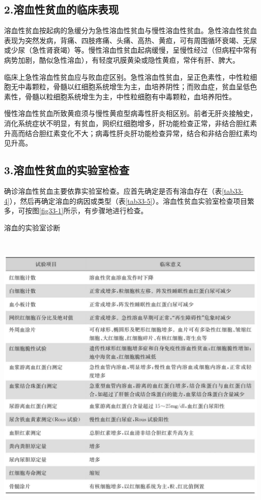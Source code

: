 \subsection{2.溶血性贫血的临床表现}

溶血性贫血按起病的急缓分为急性溶血性贫血与慢性溶血性贫血。急性溶血性贫血表现为突然发病，背痛、四肢疼痛、头痛、高热、黄疸，可有周围循环衰竭、无尿或少尿（急性肾衰竭）等。慢性溶血性贫血起病缓慢，呈慢性经过（但病程中常有病势加剧，酷似急性溶血），有轻度巩膜黄染或隐性黄疸，常伴有肝、脾大。

临床上急性溶血性贫血应与败血症区别。急性溶血性贫血，呈正色素性，中性粒细胞无中毒颗粒，骨髓以红细胞系统增生为主，血培养阴性；而败血症，贫血呈低色素性，骨髓以粒细胞系统增生为主，中性粒细胞有中毒颗粒，血培养阳性。

慢性溶血性贫血所致黄疸须与慢性黄疸型病毒性肝炎相区别。前者无肝炎接触史，消化系统症状不明显，有贫血，网织红细胞增多，肝功能检查正常，非结合胆红素升高而结合胆红素变化不大；病毒性肝炎肝功能检查异常，结合和非结合胆红素均见升高。

\subsection{3.溶血性贫血的实验室检查}

确诊溶血性贫血主要依靠实验室检查。应首先确定是否有溶血存在（表\ref{tab33-4}），然后再确定溶血的病因或类型（表\ref{tab33-5}）。溶血性贫血实验室检查项目繁多，可按图\ref{fig33-1}所示，有步骤地进行检查。

\begin{table}[htbp]
\centering
\caption{溶血的实验室诊断}
\label{tab33-4}
\includegraphics[width=5.91667in,height=5.63542in]{./images/Image00166.jpg}
\end{table}

